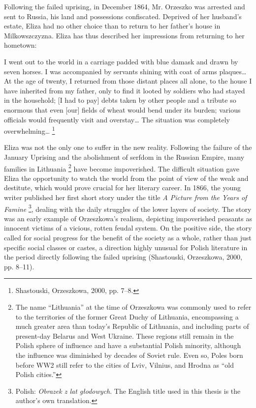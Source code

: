 Following the failed uprising, in December 1864, Mr. Orzeszko was arrested and sent to Russia, his land and possessions confiscated.
Deprived of her husband's estate, Eliza had no other choice than to return to her father's house in Milkowszczyzna.
Eliza has thus described her impressions from returning to her hometown:

\begin{displayquote}
  I went out to the world in a carriage padded with blue damask and drawn by seven horses. I was accompanied by servants shining with coat of arms plaques\ldots{} At the age of twenty, I returned from those distant places all alone, to the house I have inherited from my father, only to find it looted by soldiers who had stayed in the household; [I had to pay] debts taken by other people and a tribute %
  so enormous that even [our] fields of wheat would bend under its burden; various officials would frequently visit and overstay\ldots{} The situation was completely overwhelming\ldots{}%
\footnote{Shastouski, Orzeszkowa, 2000, pp. 7--8.}
\end{displayquote}

Eliza was not the only one to suffer in the new reality.
Following the failure of the January Uprising and the abolishment of serfdom in the Russian Empire, many families in Lithuania%
\footnote{The name ``Lithuania'' at the time of Orzeszkowa was commonly used to refer to the territories of the former Great Duchy of Lithuania, encompassing a much greater area than today's Republic of Lithuania, and including parts of present-day Belarus and West Ukraine. These regions still remain in the Polish sphere of influence and have a substantial Polish minority, although the influence was diminished by decades of Soviet rule. Even so, Poles born before WW2 still refer to the cities of Lviv, Vilnius, and Hrodna as ``old Polish cities.''}
have become impoverished.
The difficult situation gave Eliza the opportunity to watch the world from the point of view of the weak and destitute, which would prove crucial for her literary career.
In 1866, the young writer published her first short story under the title \textit{A Picture from the Years of Famine}%
\footnote{Polish: \textit{Obrazek z lat głodowych}. The English title used in this thesis is the author's own translation.}, dealing with the daily struggles of the lower layers of society.
The story was an early example of Orzeszkowa's realism, depicting impoverished peasants as innocent victims of a vicious, rotten feudal system.
On the positive side, the story called for social progress for the benefit of the society as a whole, rather than just specific social classes or castes, a direction highly unusual for Polish literature in the period directly following the failed uprising
(Shastouski, Orzeszkowa, 2000, pp. 8--11).

